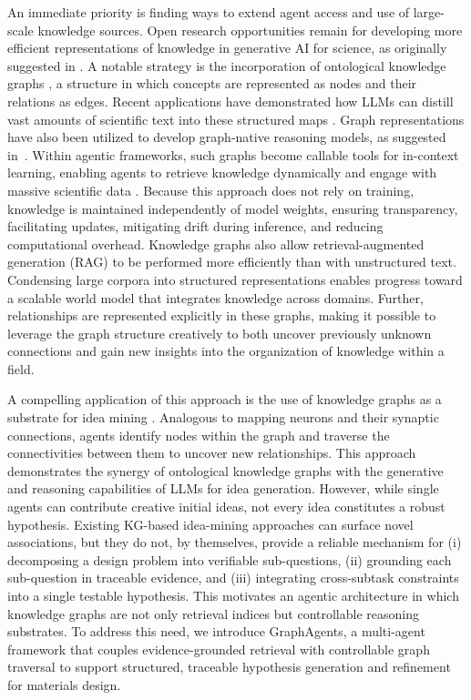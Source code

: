 An immediate priority is finding ways to extend agent access and use of large-scale knowledge sources. Open research opportunities remain for developing more efficient representations of knowledge in generative AI for science, as originally suggested in \cite{buehler_generative_2024,buehler_accelerating_2024}. A notable strategy is the incorporation of ontological knowledge graphs \cite{marquis_category_2023, mac1998categories, giesa_category_2012, markovic_optimizing_2025, sequeda_knowledge_2025,schilling-wilhelmi_text_2024,Buehler2025GraphPRefLexOR}, a structure in which concepts are represented as nodes and their relations as edges. Recent applications have demonstrated how LLMs can distill vast amounts of scientific text into these structured maps \cite{buehler_accelerating_2024,Buehler2025Chaos}. Graph  representations have also been utilized to develop graph-native reasoning models, as suggested in~\cite{Buehler2025GraphPRefLexOR}. Within agentic frameworks, such graphs become callable tools for in-context learning, enabling agents to retrieve knowledge dynamically and engage with massive scientific data \cite{ghafarollahi2025sciagents, stewart_higher-order_2026}. Because this approach does not rely on training, knowledge is maintained independently of model weights, ensuring transparency, facilitating updates, mitigating drift during inference, and reducing computational overhead. Knowledge graphs also allow retrieval-augmented generation (RAG) to be performed more efficiently than with unstructured text. Condensing large corpora into structured representations enables progress toward a scalable world model that integrates knowledge across domains. Further, relationships are represented explicitly in these graphs, making it possible to leverage the graph structure creatively to both uncover previously unknown connections and gain new insights into the organization of knowledge within a field.

A compelling application of this approach is the use of knowledge graphs as a substrate for idea mining \cite{buehler_generative_2024,buehler_accelerating_2024, ghafarollahi2025sciagents}. Analogous to mapping neurons and their synaptic connections, agents identify nodes within the graph and traverse the connectivities between them to uncover new relationships. This approach demonstrates the synergy of ontological knowledge graphs with the generative and reasoning capabilities of LLMs for idea generation. However, while single agents can contribute creative initial ideas, not every idea constitutes a robust hypothesis. 
%
Existing KG-based idea-mining approaches can surface novel associations, but they do not, by themselves, provide a reliable mechanism for (i) decomposing a design problem into verifiable sub-questions, (ii) grounding each sub-question in traceable evidence, and (iii) integrating cross-subtask constraints into a single testable hypothesis. This motivates an agentic architecture in which knowledge graphs are not only retrieval indices but controllable reasoning substrates.
%
To address this need, we introduce GraphAgents, a multi-agent framework that couples evidence-grounded retrieval with controllable graph traversal to support structured, traceable hypothesis generation and refinement for materials design.

